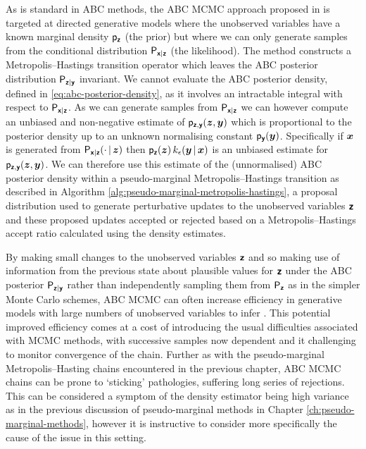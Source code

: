 As is standard in \ac{ABC} methods, the \ac{ABC} \ac{MCMC} approach proposed in \citep{marjoram2003markov} is targeted at directed generative models where the unobserved variables have a known marginal density $\mathsf{p}_{\boldsymbol{\mathsf{z}}}$ (the prior) but where we can only generate samples from the conditional distribution $\mathsf{P}_{\boldsymbol{\mathsf{x}}|\boldsymbol{\mathsf{z}}}$ (the likelihood). The method constructs a Metropolis--Hastings transition operator which leaves the \ac{ABC} posterior distribution $\mathsf{P}_{\boldsymbol{\mathsf{z}}|\boldsymbol{\mathsf{y}}}$ invariant. We cannot evaluate the \ac{ABC} posterior density, defined in \eqref{eq:abc-posterior-density}, as it involves an intractable integral with respect to $\mathsf{P}_{\boldsymbol{\mathsf{x}}|\boldsymbol{\mathsf{z}}}$. As we can generate samples from $\mathsf{P}_{\boldsymbol{\mathsf{x}}|\boldsymbol{\mathsf{z}}}$ we can however compute an unbiased and non-negative estimate of $\mathsf{p}_{\boldsymbol{\mathsf{z}},\boldsymbol{\mathsf{y}}}(\boldsymbol{z},\boldsymbol{y})$ which is proportional to the posterior density up to an unknown normalising constant $\mathsf{p}_{\boldsymbol{\mathsf{y}}}(\boldsymbol{y})$. Specifically if $\boldsymbol{x}$ is generated from $\mathsf{P}_{\boldsymbol{\mathsf{x}}|\boldsymbol{\mathsf{z}}}(\cdot \operatorname{|} \boldsymbol{z})$ then $\mathsf{p}_{\boldsymbol{\mathsf{z}}}(\boldsymbol{z})\,k_\epsilon(\boldsymbol{y}\operatorname{|}\boldsymbol{x})$ is an unbiased estimate for $\mathsf{p}_{\boldsymbol{\mathsf{z}},\boldsymbol{\mathsf{y}}}(\boldsymbol{z},\boldsymbol{y})$. We can therefore use this estimate of the (unnormalised) \ac{ABC} posterior density within a pseudo-marginal Metropolis--Hastings transition as described in Algorithm \ref{alg:pseudo-marginal-metropolis-hastings}, a proposal distribution used to generate perturbative updates to the unobserved variables $\boldsymbol{\mathsf{z}}$ and these proposed updates accepted or rejected based on a Metropolis--Hastings accept ratio calculated using the density estimates.

By making small changes to the unobserved variables $\boldsymbol{\mathsf{z}}$ and so making use of information from the previous state about plausible values for $\boldsymbol{\mathsf{z}}$ under the \ac{ABC} posterior $\mathsf{P}_{\boldsymbol{\mathsf{z}}|\boldsymbol{\mathsf{y}}}$  rather than independently sampling them from $\mathsf{P}_{\boldsymbol{\mathsf{z}}}$ as in the simpler Monte Carlo schemes, \ac{ABC} \ac{MCMC} can often increase efficiency in generative models with large numbers of unobserved variables to infer \cite{sisson2011likelihood}. This potential improved efficiency comes at a cost of introducing the usual difficulties associated with \ac{MCMC} methods, with successive samples now dependent and it challenging to monitor convergence of the chain. Further as with the pseudo-marginal Metropolis--Hasting chains encountered in the previous chapter, \ac{ABC} \ac{MCMC} chains can be prone to `sticking' pathologies, suffering long series of rejections. This can be considered a symptom of the density estimator being high variance as in the previous discussion of pseudo-marginal methods in Chapter \ref{ch:pseudo-marginal-methods}, however it is instructive to consider more specifically the cause of the issue in this setting. 

